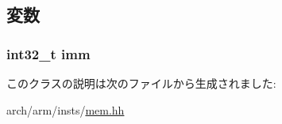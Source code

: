\subsection{変数}
\hypertarget{classArmISA_1_1MemoryImm_a71f011dbd3228d41f9e08aaf8c133f77}{
\subsubsection[{imm}]{\setlength{\rightskip}{0pt plus 5cm}int32\_\-t {\bf imm}}}
\label{classArmISA_1_1MemoryImm_a71f011dbd3228d41f9e08aaf8c133f77}


このクラスの説明は次のファイルから生成されました:\begin{DoxyCompactItemize}
\item 
arch/arm/insts/\hyperlink{arm_2insts_2mem_8hh}{mem.hh}\end{DoxyCompactItemize}
